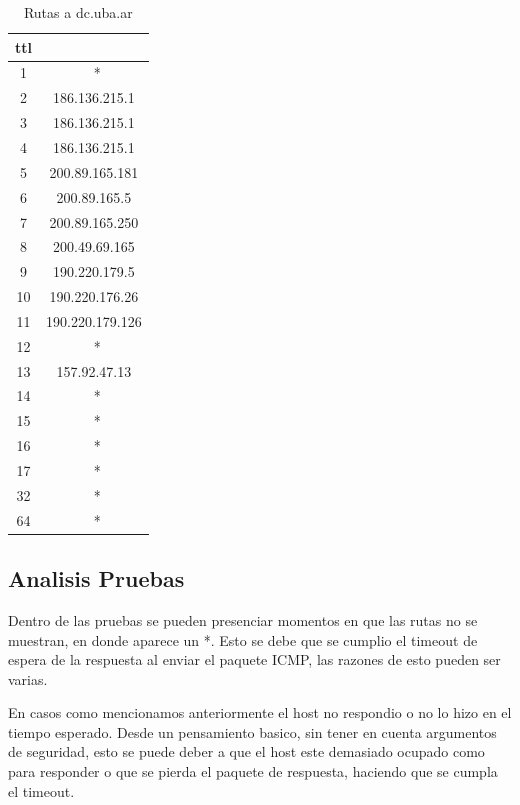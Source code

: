 \documentclass[a4paper]{article}
\begin{document}
 \begin{table}[!htb]
 	\begin{center}
 	\begin{tabular}{|c|c|}
 	  \hline
 	  ttl &  \\ \hline
	  1	&	 \ * 	\\ \hline
	  2	&	186.136.215.1	\\ \hline
	  3	&	186.136.215.1	\\ \hline
	  4	&	186.136.215.1	\\ \hline
	  5	&	200.89.165.181	\\ \hline
	  6	&	200.89.165.5	\\ \hline
	  7	&	200.89.165.250	\\ \hline
	  8	&	200.49.69.165	\\ \hline
	  9	&	190.220.179.5	\\ \hline
	  10	&	190.220.176.26	\\ \hline
	  11	&	190.220.179.126	\\ \hline
	  12	&	 \ * 	\\ \hline
	  13	&	157.92.47.13	\\ \hline
	  14	&	 \ * 	\\ \hline
	  15	&	 \ * 	\\ \hline
	  16	&	 \ * 	\\ \hline
	  17	&	 \ * 	\\ \hline
	  32	&	 \ * 	\\ \hline
	  64	&	 \ * 	\\ \hline
 	 \end{tabular}   
 	 \vspace{0pt}
 	 \caption{Rutas a dc.uba.ar}
 	\end{center}
 	\label{tab: dc.uba.ar}
 \end{table}
 
  \clearpage
 \subsection{Analisis Pruebas}
 
 Dentro de las pruebas se pueden presenciar momentos en que las rutas no se muestran, en donde aparece un *.
 Esto se debe que se cumplio el timeout de espera de la respuesta al enviar el paquete ICMP, las razones de
 esto pueden ser varias. 
 
 
 En casos como mencionamos anteriormente el host no respondio o no lo hizo en el tiempo esperado.
 Desde un pensamiento basico, sin tener en cuenta argumentos de seguridad, esto se puede deber a que 
 el host este demasiado ocupado como para responder o que se pierda el paquete de respuesta, haciendo que se cumpla el timeout.
 
\end{document}
